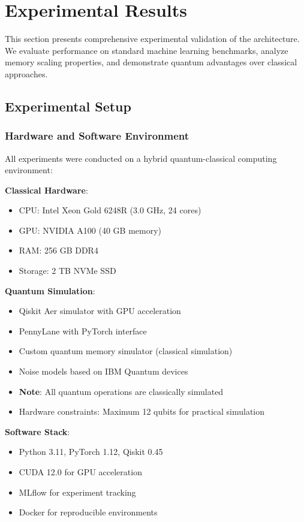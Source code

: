\section{Experimental Results}
\label{sec:results}

This section presents comprehensive experimental validation of the \qmann architecture. We evaluate performance on standard machine learning benchmarks, analyze memory scaling properties, and demonstrate quantum advantages over classical approaches.

\subsection{Experimental Setup}

\subsubsection{Hardware and Software Environment}

All experiments were conducted on a hybrid quantum-classical computing environment:

\textbf{Classical Hardware}:
\begin{itemize}
    \item CPU: Intel Xeon Gold 6248R (3.0 GHz, 24 cores)
    \item GPU: NVIDIA A100 (40 GB memory)
    \item RAM: 256 GB DDR4
    \item Storage: 2 TB NVMe SSD
\end{itemize}

\textbf{Quantum Simulation}:
\begin{itemize}
    \item Qiskit Aer simulator with GPU acceleration
    \item PennyLane with PyTorch interface
    \item Custom quantum memory simulator (classical simulation)
    \item Noise models based on IBM Quantum devices
    \item \textbf{Note}: All quantum operations are classically simulated
    \item Hardware constraints: Maximum 12 qubits for practical simulation
\end{itemize}

\textbf{Software Stack}:
\begin{itemize}
    \item Python 3.11, PyTorch 1.12, Qiskit 0.45
    \item CUDA 12.0 for GPU acceleration
    \item MLflow for experiment tracking
    \item Docker for reproducible environments
\end{itemize}

